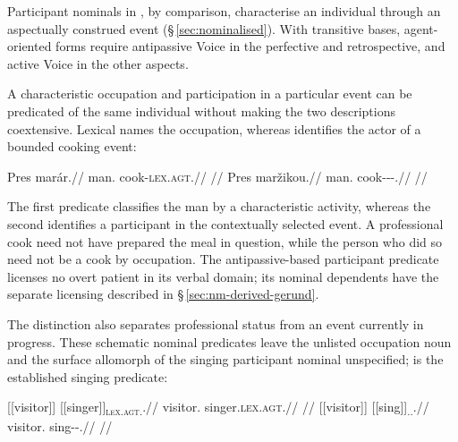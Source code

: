 Participant nominals in , by comparison, characterise an individual
through an aspectually construed event (§\,\ref{sec:nominalised}). With
transitive bases, agent-oriented forms require antipassive Voice in the
perfective and retrospective, and active Voice in the other aspects.


A characteristic occupation and participation in a particular event can be
predicated of the same individual without making the two descriptions
coextensive. Lexical  names the occupation, whereas
 identifies the actor of a bounded cooking event:

\pex\label{ex:deriv-slot-occupation}
\a
\begingl
\gla Pres marár.//
\glb man.\Dir{} cook-\textsc{lex.agt}.\Dir{}//
\glft {}
//
\endgl
\a
\begingl
\gla Pres maržikou.//
\glb man.\Dir{} cook-\Antip{}-\Pf{}-\Nmlz{}.\Dir{}//
\glft {}
//
\endgl
\xe

The first predicate classifies the man by a characteristic activity,
whereas the second identifies a participant in the contextually selected
event. A professional cook need not have prepared the meal in question,
while the person who did so need not be a cook by occupation. The
antipassive-based participant predicate licenses no overt patient in its
verbal domain; its nominal dependents have the separate licensing described
in §\,\ref{sec:nm-derived-gerund}.

The distinction also separates professional status from an event currently
in progress. These schematic nominal predicates leave the unlisted
occupation noun and the surface allomorph of the singing participant nominal
unspecified;  is the established singing predicate:

\pex\label{ex:deriv-slot-singer}
\a
\begingl
\gla \textnormal{[[visitor]]}\textsubscript{\Dir{}} \textnormal{[[singer]]}\textsubscript{\textsc{lex.agt}.\Dir{}}.//
\glb visitor.\Dir{} singer.\textsc{lex.agt}.\Dir{}//
\glft {}
//
\endgl
\a
\begingl
\gla \textnormal{[[visitor]]}\textsubscript{\Dir{}} \textnormal{[[sing]]}\textsubscript{\Prog{}.\Nmlz{}.\Dir{}}.//
\glb visitor.\Dir{} sing-\Prog{}-\Nmlz{}.\Dir{}//
\glft {}
//
\endgl
\xe


